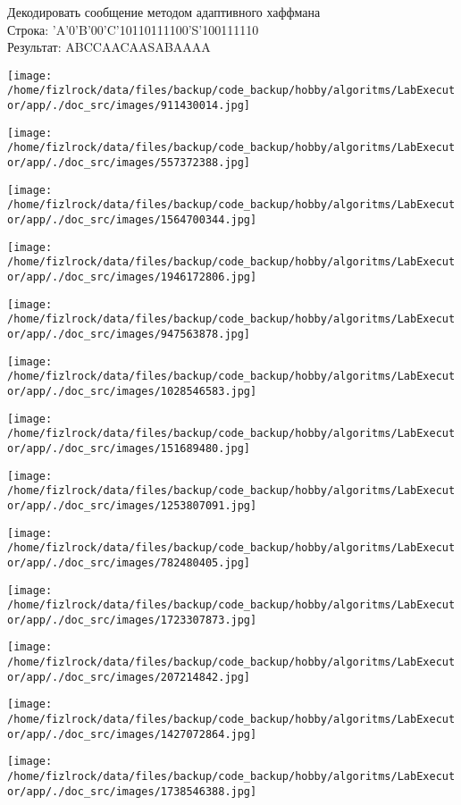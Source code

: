 \documentclass[a4paper, 12pt]{article}
\begin{document}
Декодировать сообщение методом адаптивного хаффмана \\
Строка: 
'A'0'B'00'C'10110111100'S'100111110\\
Результат: ABCCAACAASABAAAA

\texttt{[image: /home/fizlrock/data/files/backup/code\_backup/hobby/algoritms/LabExecutor/app/./doc\_src/images/911430014.jpg]}

\texttt{[image: /home/fizlrock/data/files/backup/code\_backup/hobby/algoritms/LabExecutor/app/./doc\_src/images/557372388.jpg]}

\texttt{[image: /home/fizlrock/data/files/backup/code\_backup/hobby/algoritms/LabExecutor/app/./doc\_src/images/1564700344.jpg]}

\texttt{[image: /home/fizlrock/data/files/backup/code\_backup/hobby/algoritms/LabExecutor/app/./doc\_src/images/1946172806.jpg]}

\texttt{[image: /home/fizlrock/data/files/backup/code\_backup/hobby/algoritms/LabExecutor/app/./doc\_src/images/947563878.jpg]}

\texttt{[image: /home/fizlrock/data/files/backup/code\_backup/hobby/algoritms/LabExecutor/app/./doc\_src/images/1028546583.jpg]}

\texttt{[image: /home/fizlrock/data/files/backup/code\_backup/hobby/algoritms/LabExecutor/app/./doc\_src/images/151689480.jpg]}

\texttt{[image: /home/fizlrock/data/files/backup/code\_backup/hobby/algoritms/LabExecutor/app/./doc\_src/images/1253807091.jpg]}

\texttt{[image: /home/fizlrock/data/files/backup/code\_backup/hobby/algoritms/LabExecutor/app/./doc\_src/images/782480405.jpg]}

\texttt{[image: /home/fizlrock/data/files/backup/code\_backup/hobby/algoritms/LabExecutor/app/./doc\_src/images/1723307873.jpg]}

\texttt{[image: /home/fizlrock/data/files/backup/code\_backup/hobby/algoritms/LabExecutor/app/./doc\_src/images/207214842.jpg]}

\texttt{[image: /home/fizlrock/data/files/backup/code\_backup/hobby/algoritms/LabExecutor/app/./doc\_src/images/1427072864.jpg]}

\texttt{[image: /home/fizlrock/data/files/backup/code\_backup/hobby/algoritms/LabExecutor/app/./doc\_src/images/1738546388.jpg]}
\end{document}
